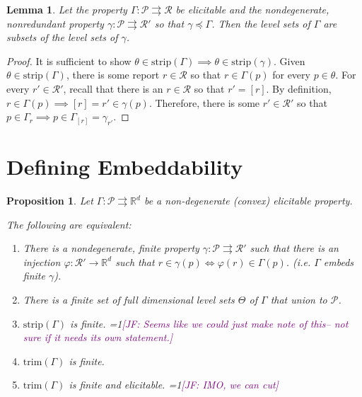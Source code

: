 \documentclass[12pt]{article}
\newcommand{\Comments}{1}
\newcommand{\mynote}[2]{\ifnum\Comments=1\textcolor{#1}{#2}\fi}
\newcommand{\jessie}[1]{\mynote{purple}{[JF: #1]}}
\newcommand{\reals}{\mathbb{R}}
\renewcommand{\P}{\mathcal{P}}
\newcommand{\R}{\mathcal{R}}
\newcommand{\toto}{\rightrightarrows}
\newcommand{\trim}{\mathrm{trim}}
\newcommand{\strip}{\mathrm{strip}}
\newtheorem{lemma}{Lemma}
\newtheorem{proposition}{Proposition}
\begin{document}
\begin{lemma}\label{lem:lev-sets-subsets}
	Let the property $\Gamma: \P \toto \R$ be elicitable and the nondegenerate, nonredundant property $\gamma: \P \toto \R'$ so that $\gamma \preceq \Gamma$.
	Then the level sets of $\Gamma$ are subsets of the level sets of $\gamma$.
\end{lemma}

\begin{proof}
	It is sufficient to show $\theta \in \strip(\Gamma) \implies \theta \in \strip(\gamma)$.
	Given $\theta \in \strip(\Gamma)$, there is some report $r \in \R$ so that $r \in \Gamma(p)$ for every $p \in \theta$.
	For every $r' \in \R'$, recall that there is an $r \in \R$ so that $r' = [r]$.
	By definition, $r \in \Gamma(p) \implies [r] = r' \in \gamma(p)$.
	Therefore, there is some $r' \in \R'$ so that $p \in \Gamma_r \implies p \in \Gamma_{[r]} = \gamma_{r'}$.
%	
\end{proof}




\section{Defining Embeddability}


\begin{proposition}\label{prop:optimal-reports-per-level-set}
  Let $\Gamma:\P\toto\reals^d$ be a non-degenerate (convex) elicitable property.

  The following are equivalent:
  \begin{enumerate}
  \item There is a nondegenerate, finite property $\gamma:\P\toto\R'$ such that there is an injection $\varphi:\R'\to\reals^d$ such that $r\in\gamma(p) \iff \varphi(r) \in \Gamma(p)$. (i.e. $\Gamma$ embeds finite $\gamma$).  
    
  \item There is a finite set of full dimensional level sets $\Theta$ of $\Gamma$ that union to $\P$.
  \item $\strip(\Gamma)$ is finite. \jessie{Seems like we could just make note of this-- not sure if it needs its own statement.}
  \item $\trim(\Gamma)$ is finite. 
  \item $\trim(\Gamma)$ is finite and elicitable. \jessie{IMO, we can cut}
  \end{enumerate}
\end{proposition}
\end{document}

